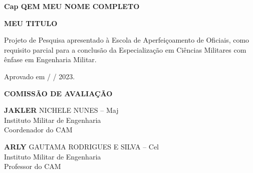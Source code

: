 \documentclass[12pt,a4paper]{article}
\def\mytitle{MEU TITULO}
\def\myname{Cap QEM MEU NOME COMPLETO}
\begin{document}
\begin{titlepage}
    \centering

   \vspace*{3cm} %

    \textbf{\myname} %

    \vspace*{2\baselineskip} %

    \textbf{\mytitle} %
    


    \vspace*{2\baselineskip} %

    \begin{flushright}
    \begin{minipage}{0.5\textwidth}
        \singlespacing
        Projeto de Pesquisa apresentado à Escola de Aperfeiçoamento de Oficiais, como requisito parcial para a conclusão da Especialização em Ciências Militares com ênfase em Engenharia Militar. 
    \end{minipage}
    \end{flushright}
    \doublespacing

    \vspace*{2\baselineskip} %

    \begin{flushleft}
        Aprovado em \makebox[1cm]{\hrulefill} /  \makebox[1cm]{\hrulefill} /  2023. %
    \end{flushleft}


    \textbf{COMISSÃO DE AVALIAÇÃO}
    \vspace*{\baselineskip} %

    \begin{center}
        \makebox[10cm]{\hrulefill}
        \vspace{-0.5cm}
        \singlespacing
        \textbf{JAKLER} NICHELE NUNES – Maj \\
        Instituto Militar de Engenharia \\
        Coordenador do CAM %
        
        \vspace{4\baselineskip}
        
        \makebox[10cm]{\hrulefill}
        \vspace{-0.5cm}
        \singlespacing
        \textbf{ARLY} GAUTAMA RODRIGUES E SILVA – Cel \\
        Instituto Militar de Engenharia \\
        Professor do CAM %
        \vspace{2\baselineskip}
    \end{center}
\end{titlepage}
\end{document}
